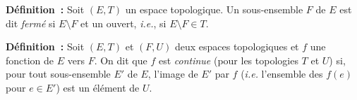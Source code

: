 \medskip

\noindent\textbf{Définition :} Soit $(E, T)$ un espace topologique.
    Un sous-ensemble $F$ de $E$ est dit \emph{fermé} si $E \setminus F$ et un ouvert, \emph{i.e.}, si $E \setminus F \in T$.

\medskip

\noindent\textbf{Définition :} Soit $(E, T)$ et $(F, U)$ deux espaces topologiques et $f$ une fonction de $E$ vers $F$.
    On dit que $f$ est \emph{continue} (pour les topologies $T$ et $U$) si, pour tout sous-ensemble $E'$ de $E$, l'image de $E'$ par $f$ (\emph{i.e.} l'ensemble des $f(e)$ pour $e \in E'$) est un élément de $U$.

